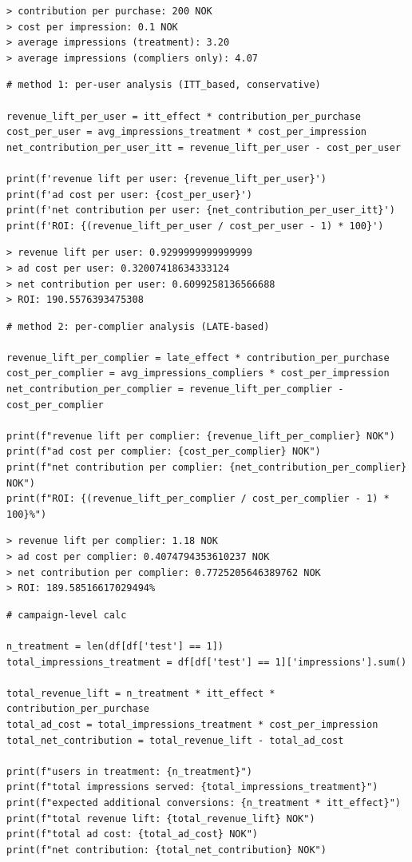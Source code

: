 \documentclass[10pt]{article}
\begin{document}
\begin{verbatim}
> contribution per purchase: 200 NOK
> cost per impression: 0.1 NOK
> average impressions (treatment): 3.20
> average impressions (compliers only): 4.07
\end{verbatim}
\newpage 
\begin{lstlisting}
# method 1: per-user analysis (ITT_based, conservative)

revenue_lift_per_user = itt_effect * contribution_per_purchase
cost_per_user = avg_impressions_treatment * cost_per_impression
net_contribution_per_user_itt = revenue_lift_per_user - cost_per_user

print(f'revenue lift per user: {revenue_lift_per_user}')
print(f'ad cost per user: {cost_per_user}')
print(f'net contribution per user: {net_contribution_per_user_itt}')
print(f'ROI: {(revenue_lift_per_user / cost_per_user - 1) * 100}')
\end{lstlisting}
\begin{verbatim}
> revenue lift per user: 0.9299999999999999
> ad cost per user: 0.32007418634333124
> net contribution per user: 0.6099258136566688
> ROI: 190.5576393475308
\end{verbatim}
\begin{lstlisting}
# method 2: per-complier analysis (LATE-based)

revenue_lift_per_complier = late_effect * contribution_per_purchase
cost_per_complier = avg_impressions_compliers * cost_per_impression
net_contribution_per_complier = revenue_lift_per_complier - cost_per_complier

print(f"revenue lift per complier: {revenue_lift_per_complier} NOK")
print(f"ad cost per complier: {cost_per_complier} NOK")
print(f"net contribution per complier: {net_contribution_per_complier} NOK")
print(f"ROI: {(revenue_lift_per_complier / cost_per_complier - 1) * 100}%")
\end{lstlisting}
\begin{verbatim}
> revenue lift per complier: 1.18 NOK
> ad cost per complier: 0.4074794353610237 NOK
> net contribution per complier: 0.7725205646389762 NOK
> ROI: 189.58516617029494%
\end{verbatim}
\begin{lstlisting}
# campaign-level calc

n_treatment = len(df[df['test'] == 1])
total_impressions_treatment = df[df['test'] == 1]['impressions'].sum()

total_revenue_lift = n_treatment * itt_effect * contribution_per_purchase
total_ad_cost = total_impressions_treatment * cost_per_impression
total_net_contribution = total_revenue_lift - total_ad_cost

print(f"users in treatment: {n_treatment}")
print(f"total impressions served: {total_impressions_treatment}")
print(f"expected additional conversions: {n_treatment * itt_effect}")
print(f"total revenue lift: {total_revenue_lift} NOK")
print(f"total ad cost: {total_ad_cost} NOK")
print(f"net contribution: {total_net_contribution} NOK")
\end{lstlisting}
\end{document}
